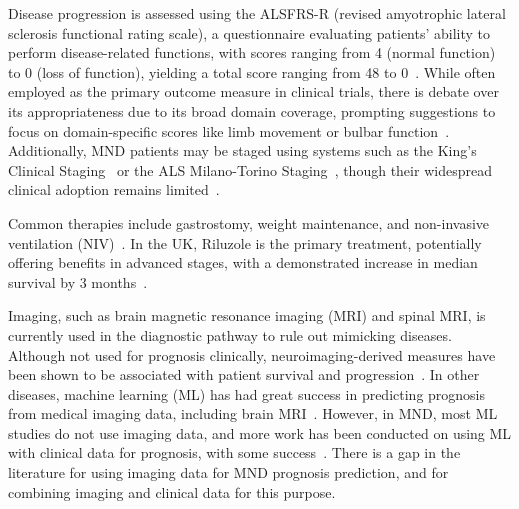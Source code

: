 Disease progression is assessed using the ALSFRS-R (revised amyotrophic lateral sclerosis functional rating scale), a questionnaire evaluating patients' ability to perform disease-related functions, with scores ranging from 4 (normal function) to 0 (loss of function), yielding a total score ranging from 48 to 0~\cite{cedarbaumALSFRSRRevisedALS1999}.
While often employed as the primary outcome measure in clinical trials, there is debate over its appropriateness due to its broad domain coverage, prompting suggestions to focus on domain-specific scores like limb movement or bulbar function~\cite{vaneijkOldFriendWho2021, rooneyWhatDoesALSFRSR2017}.
Additionally, MND patients may be staged using systems such as the King's Clinical Staging~\cite{rocheProposedStagingSystem2012} or the ALS Milano-Torino Staging~\cite{chioDevelopmentEvaluationClinical2015}, though their widespread clinical adoption remains limited~\cite{feldmanAmyotrophicLateralSclerosis2022, fangComparisonKingMiToS2017}.

Common therapies include gastrostomy, weight maintenance, and non-invasive ventilation (NIV)~\cite{bourkeEffectsNoninvasiveVentilation2006}.
In the UK, Riluzole is the primary treatment, potentially offering benefits in advanced stages, with a demonstrated increase in median survival by 3 months~\cite{millerRiluzoleAmyotrophicLateral2012, hinchcliffeRiluzoleRealworldEvidence2017}.


Imaging, such as brain magnetic resonance imaging (MRI) and spinal MRI, is currently used in the diagnostic pathway to rule out mimicking diseases.
Although not used for prognosis clinically, neuroimaging-derived measures have been shown to be associated with patient survival and progression~\cite{mullerLargescaleMulticentreCerebral2016,agostaMRIPredictorsLongterm2010}.
In other diseases, machine learning (ML) has had great success in predicting prognosis from medical imaging data, including brain MRI~\cite{gerratyMachineLearningParkinson2023}.
However, in MND, most ML studies do not use imaging data, and more work has been conducted on using ML with clinical data for prognosis, with some success~\cite{grollemundMachineLearningAmyotrophic2019, papaizMachineLearningSolutions2022}.
There is a gap in the literature for using imaging data for MND prognosis prediction, and for combining imaging and clinical data for this purpose.


